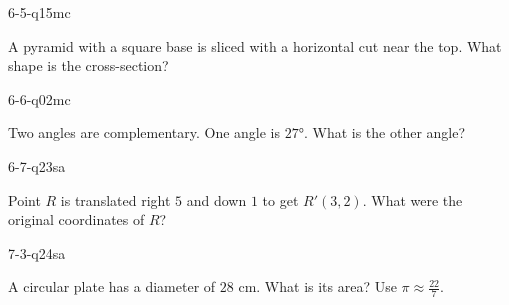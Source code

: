 \begin{practiceQuestion}{6-5-q15}{mc}
\begin{questionText}
A pyramid with a square base is sliced with a horizontal cut near the top. What shape is the cross-section?
\end{questionText}
\end{practiceQuestion}

\begin{practiceQuestion}{6-6-q02}{mc}
\begin{questionText}
Two angles are complementary. One angle is $27°$. What is the other angle?
\end{questionText}
\end{practiceQuestion}

\begin{practiceQuestion}{6-7-q23}{sa}
\begin{questionText}
Point $R$ is translated right $5$ and down $1$ to get $R'(3, 2)$. What were the original coordinates of $R$?
\end{questionText}
\end{practiceQuestion}

\begin{practiceQuestion}{7-3-q24}{sa}
\begin{questionText}
A circular plate has a diameter of $28$ cm. What is its area? Use $\pi \approx \frac{22}{7}$.
\end{questionText}
\end{practiceQuestion}

